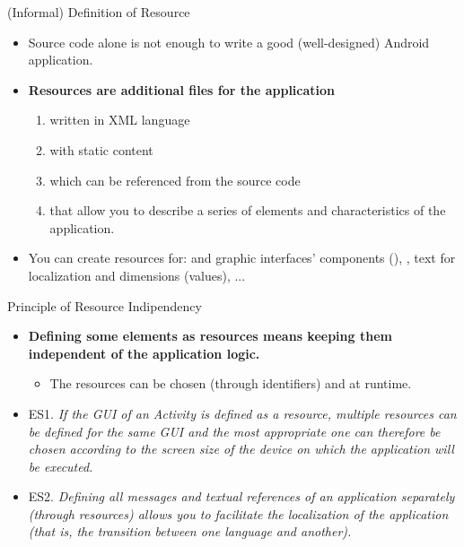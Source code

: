 \documentclass{beamer}
\begin{document}
  \begin{frame}{(Informal) Definition of Resource}
    \begin{itemize}\itemsep10pt
      \item Source code alone is not enough to write a good (well-designed)
      Android application. 
      \item \textbf{Resources are additional files for the application} 
      \begin{enumerate}
        \item written in XML language 
        \item with static content
        \item which can be referenced from the source code
        \item that allow you to describe a series of elements and
        characteristics of the application.
      \end{enumerate}
      
      \item You can create resources for:  and graphic interfaces'
      components (), , text for localization and
      dimensions (values), ...
    \end{itemize}
  \end{frame}

  \begin{frame}{Principle of Resource Indipendency}
    \begin{itemize}\itemsep10pt
      \item \textbf{Defining some elements as resources means keeping them
      independent of the application logic.}
    \begin{itemize}
      \item The resources can be chosen (through identifiers) and
       at runtime.
    \end{itemize}
      \item ES1. \textit{If the GUI of an Activity is defined as a resource,
      multiple resources can be defined for the same GUI and the most
      appropriate one can therefore be chosen according to the screen size of
      the device on which the application will be executed.}
      \item ES2. \textit{Defining all messages and textual references of an
      application separately (through resources) allows you to facilitate the
      localization of the application (that is, the transition between one
      language and another).} 
    \end{itemize}
  \end{frame}
\end{document}
